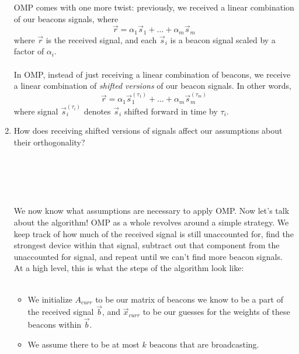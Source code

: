 \begin{enumerate}
    OMP comes with one more twist: previously, we received a linear combination of our beacons signals, where
    $$ \vec{r} = \alpha_1\vec{s}_1 + \dots + \alpha_m\vec{s}_m $$
    where $\vec{r}$ is the received signal, and each $\vec{s}_i$ is a beacon signal scaled by a factor of $\alpha_i$.
    \\ \\
    In OMP, instead of just receiving a linear combination of beacons, we receive a linear
    combination of \textit{shifted versions} of our beacon signals. In other words,
    $$ \vec{r} = \alpha_1\vec{s}_1^{(\tau_1)} + \dots + \alpha_m\vec{s}_m^{(\tau_m)} $$
    where signal $\vec{s}_i^{(\tau_i)}$ denotes $\vec{s}_i$ shifted forward in time by $\tau_i$.
    \item How does receiving shifted versions of signals affect our assumptions about their orthogonality?
    \\ \\
    \answerbox{0.5cm}
    \\ \\
    \\ \\
    We now know what assumptions are necessary to apply OMP. Now let's talk about the algorithm!
    OMP as a whole revolves around a simple strategy. We keep track of how much of the received signal is
    still unaccounted for, find the strongest device within that signal, subtract out that component from
    the unaccounted for signal, and repeat until we can't find more beacon signals.
    At a high level, this is what the steps of the algorithm look like:
    \\ \\
    \begin{itemize}
        \item We initialize $A_{curr}$ to be our matrix of beacons we know to be a part of the received signal $\vec{b}$,
        and $\vec{x}_{curr}$ to be our guesses for the weights of these beacons within $\vec{b}$.
        \item We assume there to be at most $k$ beacons that are broadcasting.

\end{itemize}
\end{enumerate}
